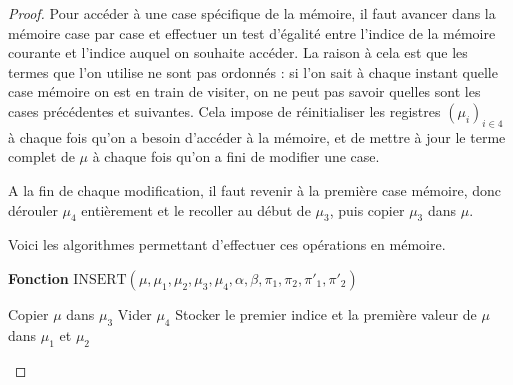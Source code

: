 \documentclass{report}
\begin{document}
\begin{proof}
					Pour accéder à une case spécifique de la mémoire, il faut avancer dans la mémoire case par case et effectuer un test d'égalité entre l'indice de la mémoire courante et l'indice auquel on souhaite accéder. La raison à cela est que les termes que l'on utilise ne sont pas ordonnés : si l'on sait à chaque instant quelle case mémoire on est en train de visiter, on ne peut pas savoir quelles sont les cases précédentes et suivantes. Cela impose de réinitialiser les registres $\left( \mu_i \right)_{i\in 4}$ à chaque fois qu'on a besoin d'accéder à la mémoire, et de mettre à jour le terme complet de $\mu$ à chaque fois qu'on a fini de modifier une case. 
					
					A la fin de chaque modification, il faut revenir à la première case mémoire, donc dérouler $\mu_4$ entièrement et le recoller au début de $\mu_3$, puis copier $\mu_3$ dans $\mu$. 
					
					\espace
					
					Voici les algorithmes permettant d'effectuer ces opérations en mémoire.
					
					\espace 
					
					\begin{algorithm}[H]
						\label{algo:A_RAM_fn_INSERT}
						
						\textbf{Fonction} $\text{INSERT}\left( \mu, \mu_1, \mu_2, \mu_3, \mu_4, \alpha, \beta, \pi_1, \pi_2, \pi'_1, \pi'_2\right)$
						
						
						\espace 
						
						
						
						\espace
						
						
						Copier $\mu$ dans $\mu_3$ \;
						Vider $\mu_4$ \;
						Stocker le premier indice et la première valeur de $\mu$ dans $\mu_1$ et $\mu_2$ \;
						

\end{algorithm}
\end{proof}
\end{document}
